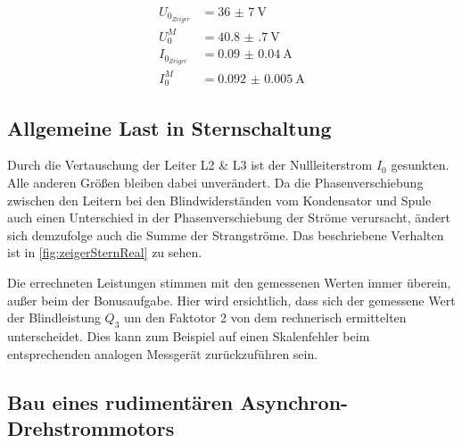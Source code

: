 \documentclass[12pt,english,ngerman]{scrartcl}
\begin{document}
\begin{align*}
	U_{0_{Zeiger}} & = \SI{36(7)}{\volt}      \\
	U_{0}^M        & = \SI{40.8(7)}{\volt}    \\
	I_{0_{Zeiger}} & = \SI{0.09(4)}{\ampere}  \\
	I_{0}^M        & = \SI{0.092(5)}{\ampere}
\end{align*}

\subsection{Allgemeine Last in Sternschaltung}

Durch die Vertauschung der Leiter L2 \& L3 ist der Nullleiterstrom $I_0$
gesunkten. Alle anderen Größen bleiben dabei unverändert. Da die
Phasenverschiebung zwischen den Leitern bei den Blindwiderständen vom
Kondensator und Spule auch einen Unterschied in der Phasenverschiebung der
Ströme verursacht, ändert sich demzufolge auch die Summe der Strangströme. Das
beschriebene Verhalten ist in \autoref{fig:zeigerSternReal} zu sehen.

Die errechneten Leistungen stimmen mit den gemessenen Werten immer überein,
außer beim der Bonusaufgabe. Hier wird ersichtlich, dass sich der gemessene
Wert der Blindleistung $Q_3$ um den Faktotor 2 von dem rechnerisch ermittelten
unterscheidet. Dies kann zum Beispiel auf einen Skalenfehler beim
entsprechenden analogen Messgerät zurückzuführen sein.

\subsection{Bau eines rudimentären Asynchron-Drehstrommotors}
\end{document}
